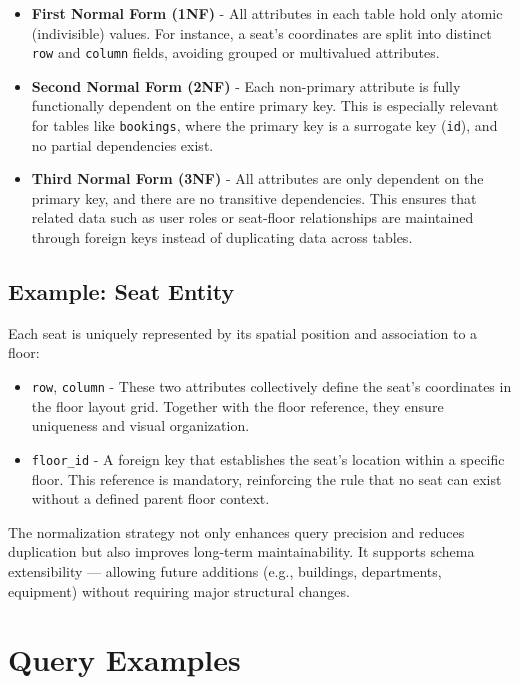 \documentclass[12pt,a4paper]{report} %
\begin{document}
\begin{itemize}
    \item \textbf{First Normal Form (1NF)} - All attributes in each table hold only atomic (indivisible) values. For instance, a seat's coordinates are split into distinct \texttt{row} and \texttt{column} fields, avoiding grouped or multivalued attributes.
    
    \item \textbf{Second Normal Form (2NF)} - Each non-primary attribute is fully functionally dependent on the entire primary key. This is especially relevant for tables like \texttt{bookings}, where the primary key is a surrogate key (\texttt{id}), and no partial dependencies exist.

    \item \textbf{Third Normal Form (3NF)} - All attributes are only dependent on the primary key, and there are no transitive dependencies. This ensures that related data such as user roles or seat-floor relationships are maintained through foreign keys instead of duplicating data across tables.
\end{itemize}

\subsection*{Example: Seat Entity}

Each seat is uniquely represented by its spatial position and association to a floor:

\begin{itemize}
    \item \texttt{row}, \texttt{column} - These two attributes collectively define the seat's coordinates in the floor layout grid. Together with the floor reference, they ensure uniqueness and visual organization.
    
    \item \texttt{floor\_id} - A foreign key that establishes the seat's location within a specific floor. This reference is mandatory, reinforcing the rule that no seat can exist without a defined parent floor context.
\end{itemize}

The normalization strategy not only enhances query precision and reduces duplication but also improves long-term maintainability. It supports schema extensibility — allowing future additions (e.g., buildings, departments, equipment) without requiring major structural changes.

\section{Query Examples}
\end{document}
